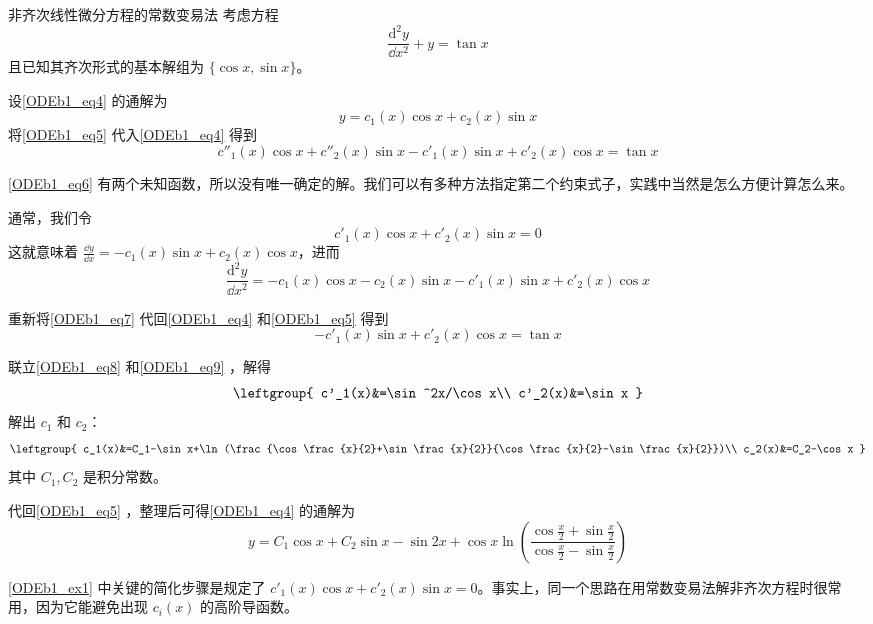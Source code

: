 \begin{example}{非齐次线性微分方程的常数变易法}\label{ODEb1_ex1}
考虑方程
\begin{equation}\label{ODEb1_eq4}
\frac{\mathrm{d}^2 y}{\dd x^2}+y=\tan x
\end{equation}
且已知其齐次形式的基本解组为 $\{\cos x, \sin x\}$。

设\autoref{ODEb1_eq4} 的通解为
\begin{equation}\label{ODEb1_eq5}
y=c_1(x)\cos x+c_2(x)\sin x
\end{equation}
将\autoref{ODEb1_eq5} 代入\autoref{ODEb1_eq4} 得到
\begin{equation}\label{ODEb1_eq6}
c''_1(x)\cos x+c''_2(x)\sin x-c'_1(x)\sin x+c'_2(x)\cos x=\tan x
\end{equation}

\autoref{ODEb1_eq6} 有两个未知函数，所以没有唯一确定的解。我们可以有多种方法指定第二个约束式子，实践中当然是怎么方便计算怎么来。

通常，我们令
\begin{equation}\label{ODEb1_eq8}
c'_1(x)\cos x+c'_2(x)\sin x=0
\end{equation}
这就意味着 $\frac{\dd y}{\dd x}=-c_1(x)\sin x+c_2(x)\cos x$，进而
\begin{equation}\label{ODEb1_eq7}
\frac{\mathrm{d}^2 y}{\dd x^2}=-c_1(x)\cos x-c_2(x)\sin x-c'_1(x)\sin x+c'_2(x)\cos x
\end{equation}

重新将\autoref{ODEb1_eq7} 代回\autoref{ODEb1_eq4} 和\autoref{ODEb1_eq5} 得到
\begin{equation}\label{ODEb1_eq9}
-c'_1(x)\sin x+c'_2(x)\cos x=\tan x
\end{equation}

联立\autoref{ODEb1_eq8} 和\autoref{ODEb1_eq9} ，解得
\begin{equation}
\leftgroup{
c'_1(x)&=\sin^2x/\cos x\\
c'_2(x)&=\sin x
}
\end{equation}
解出 $c_1$ 和 $c_2$：
\begin{equation}
\leftgroup{
    c_1(x)&=C_1-\sin x+\ln(\frac{\cos\frac{x}{2}+\sin\frac{x}{2}}{\cos\frac{x}{2}-\sin\frac{x}{2}})\\
    c_2(x)&=C_2-\cos x
}
\end{equation}
其中 $C_1, C_2$ 是积分常数。

代回\autoref{ODEb1_eq5} ，整理后可得\autoref{ODEb1_eq4} 的通解为
\begin{equation}
y=C_1\cos x+C_2\sin x-\sin 2x+\cos x\ln(\frac{\cos\frac{x}{2}+\sin\frac{x}{2}}{\cos\frac{x}{2}-\sin\frac{x}{2}})
\end{equation}




\end{example}


\autoref{ODEb1_ex1} 中关键的简化步骤是规定了 $c'_1(x)\cos x+c'_2(x)\sin x=0$。事实上，同一个思路在用常数变易法解非齐次方程时很常用，因为它能避免出现 $c_i(x)$ 的高阶导函数。
















